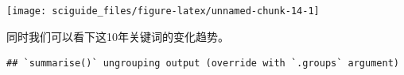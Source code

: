 \documentclass[]{tufte-book}
\newenvironment{Shaded}{}{}
\newcommand{\DataTypeTok}[1]{\textcolor[rgb]{0.56,0.13,0.00}{#1}}
\newcommand{\KeywordTok}[1]{\textcolor[rgb]{0.00,0.44,0.13}{\textbf{#1}}}
\newcommand{\NormalTok}[1]{#1}
\newcommand{\OperatorTok}[1]{\textcolor[rgb]{0.40,0.40,0.40}{#1}}
\newcommand{\StringTok}[1]{\textcolor[rgb]{0.25,0.44,0.63}{#1}}
\begin{document}
\texttt{[image: sciguide\_files/figure-latex/unnamed-chunk-14-1]}

同时我们可以看下这10年关键词的变化趋势。

\begin{Shaded}
\end{Shaded}

\begin{verbatim}
## `summarise()` ungrouping output (override with `.groups` argument)
\end{verbatim}
\end{document}
